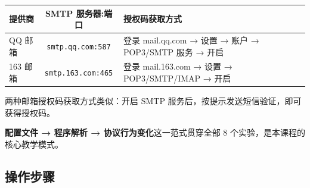 \documentclass[12pt,a4paper]{ctexart}
\begin{document}
\begin{center}
\begin{tabular}{lcl}
\toprule
提供商 & SMTP 服务器:端口 & 授权码获取方式 \\
\midrule
QQ 邮箱 & \texttt{smtp.qq.com:587} & 登录 mail.qq.com → 设置 → 账户 → POP3/SMTP 服务 → 开启 \\
163 邮箱 & \texttt{smtp.163.com:465} & 登录 mail.163.com → 设置 → POP3/SMTP/IMAP → 开启 \\
\bottomrule
\end{tabular}
\end{center}

两种邮箱授权码获取方式类似：开启 SMTP 服务后，按提示发送短信验证，即可获得授权码。

\textbf{配置文件 → 程序解析 → 协议行为变化}这一范式贯穿全部 8 个实验，是本课程的核心教学模式。

\subsection{操作步骤}
\end{document}
